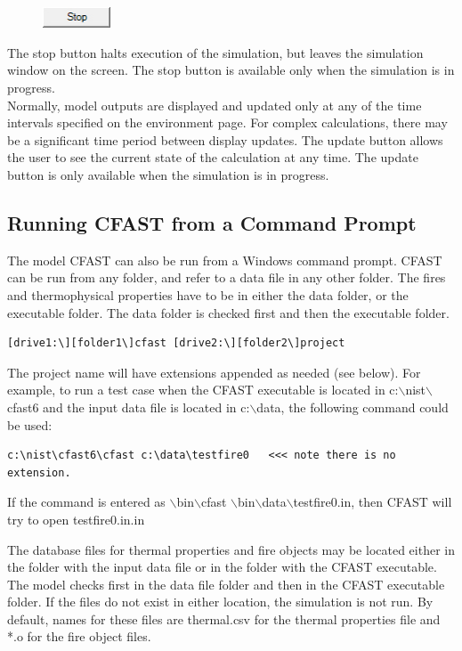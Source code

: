 \begin{figure}
  \includegraphics[width=0.79in]{FIGURES/Running_CFAST/Stop_Button}
\end{figure}

 The stop button halts execution of the simulation, but leaves the simulation window on the screen.  The stop button is available only when the simulation is in progress. \\

Normally, model outputs are displayed and updated only at any of the time intervals specified on the environment page. For complex calculations, there may be a significant time period between display updates. The update button allows the user to see the current state of the calculation at any time. The update button is only available when the simulation is in progress.

\subsection{Running CFAST from a Command Prompt}

The model CFAST can also be run from a Windows command prompt.  CFAST can be run from any folder, and refer to a data file in any other folder. The fires and thermophysical properties have to be in either the data folder, or the executable folder. The data folder is checked first and then the executable folder.

\begin{lstlisting}
[drive1:\][folder1\]cfast [drive2:\][folder2\]project
\end{lstlisting}

The project name will have extensions appended as needed (see below). For example, to run a test case when the CFAST executable is located in c:$\backslash$nist$\backslash$cfast6 and the input data file is located in c:$\backslash$data, the following command could be used:

\begin{lstlisting}
c:\nist\cfast6\cfast c:\data\testfire0   <<< note there is no extension.
\end{lstlisting}

If the command is entered as $\backslash$bin$\backslash$cfast $\backslash$bin$\backslash$data$\backslash$testfire0.in, then CFAST will try to open testfire0.in.in

The database files for thermal properties and fire objects may be located either in the folder with the input data file or in the folder with the CFAST executable. The model checks first in the data file folder and then in the CFAST executable folder.  If the files do not exist in either location, the simulation is not run. By default, names for these files are thermal.csv for the thermal properties file and *.o for the fire object files.

